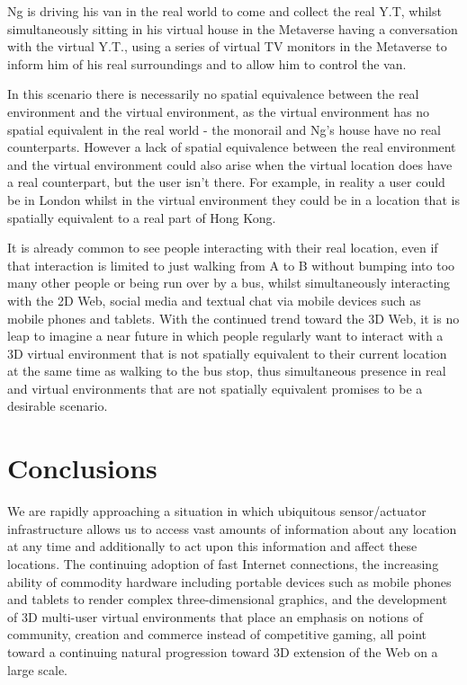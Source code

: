 Ng is driving his van in the real world to come and collect the real Y.T, whilst simultaneously sitting in his virtual house in the Metaverse having a conversation with the virtual Y.T., using a series of virtual TV monitors in the Metaverse to inform him of his real surroundings and to allow him to control the van.

In this scenario there is necessarily no spatial equivalence between the real environment and the virtual environment, as the virtual environment has no spatial equivalent in the real world - the monorail and Ng's house have no real counterparts. However a lack of spatial equivalence between the real environment and the virtual environment could also arise when the virtual location does have a real counterpart, but the user isn't there. For example, in reality a user could be in London whilst in the virtual environment they could be in a location that is spatially equivalent to a real part of Hong Kong.

It is already common to see people interacting with their real location, even if that interaction is limited to just walking from A to B without bumping into too many other people or being run over by a bus, whilst simultaneously interacting with the 2D Web, social media and textual chat via mobile devices such as mobile phones and tablets. With the continued trend toward the 3D Web, it is no leap to imagine a near future in which people regularly want to interact with a 3D virtual environment that is not spatially equivalent to their current location at the same time as walking to the bus stop, thus simultaneous presence in real and virtual environments that are not spatially equivalent promises to be a desirable scenario.

\section{Conclusions}
We are rapidly approaching a situation in which ubiquitous sensor/actuator infrastructure allows us to access vast amounts of information about any location at any time and additionally to act upon this information and affect these locations. The continuing adoption of fast Internet connections, the increasing ability of commodity hardware including portable devices such as mobile phones and tablets to render complex three-dimensional graphics, and the development of 3D multi-user virtual environments that place an emphasis on notions of community, creation and commerce instead of competitive gaming, all point toward a continuing natural progression toward 3D extension of the Web on a large scale.

